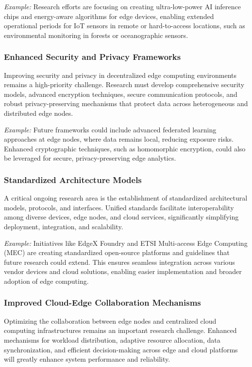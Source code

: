 \documentclass[runningheads]{llncs}
\begin{document}
\noindent\textit{Example:} Research efforts are focusing on creating ultra-low-power AI inference chips and energy-aware algorithms for edge devices, enabling extended operational periods for IoT sensors in remote or hard-to-access locations, such as environmental monitoring in forests or oceanographic sensors.

\subsubsection{Enhanced Security and Privacy Frameworks}
Improving security and privacy in decentralized edge computing environments remains a high-priority challenge. Research must develop comprehensive security models, advanced encryption techniques, secure communication protocols, and robust privacy-preserving mechanisms that protect data across heterogeneous and distributed edge nodes.

\noindent\textit{Example:} Future frameworks could include advanced federated learning approaches at edge nodes, where data remains local, reducing exposure risks. Enhanced cryptographic techniques, such as homomorphic encryption, could also be leveraged for secure, privacy-preserving edge analytics.

\subsubsection{Standardized Architecture Models}
A critical ongoing research area is the establishment of standardized architectural models, protocols, and interfaces. Unified standards facilitate interoperability among diverse devices, edge nodes, and cloud services, significantly simplifying deployment, integration, and scalability.

\noindent\textit{Example:} Initiatives like EdgeX Foundry and ETSI Multi-access Edge Computing (MEC) are creating standardized open-source platforms and guidelines that future research could extend. This ensures seamless integration across various vendor devices and cloud solutions, enabling easier implementation and broader adoption of edge computing.

\subsubsection{Improved Cloud-Edge Collaboration Mechanisms}
Optimizing the collaboration between edge nodes and centralized cloud computing infrastructures remains an important research challenge. Enhanced mechanisms for workload distribution, adaptive resource allocation, data synchronization, and efficient decision-making across edge and cloud platforms will greatly enhance system performance and reliability.
\end{document}
